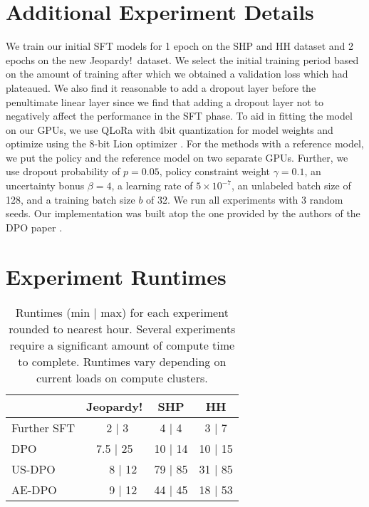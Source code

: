 \documentclass{article} \usepackage{iclr2023_conference,times}
\newcommand{\add}[1]{#1}
\begin{document}
\section{Additional Experiment Details}
\label{a:additional_details}
We train our initial SFT models for 1 epoch on the SHP and HH dataset and 2 epochs on the new Jeopardy!\ dataset.
We select the initial training period based on the amount of training after which we obtained a validation loss which had plateaued.
We also find it reasonable to add a dropout layer before the penultimate linear layer since we find that adding a dropout layer not to negatively affect the performance in the SFT phase.
To aid in fitting the model on our GPUs, we use QLoRa \citep{lora, qlora} with 4bit quantization for model weights and optimize using the 8-bit Lion optimizer \citep{chen2023symbolic}.
For the methods with a reference model, we put the policy and the reference model on two separate GPUs. Further, we use dropout probability of $p=0.05$, policy constraint weight $\gamma=0.1$, an uncertainty bonus $\beta = 4$, a learning rate of $5 \times 10^{-7}$, an unlabeled batch size of 128, and a training batch size $b$ of 32. We run all experiments with 3 random seeds. \add{Our implementation was built atop the one provided by the authors of the DPO paper \citep{dpo}.}


\section{Experiment Runtimes}
\label{a:exptruntimes}
\begin{table}[h!]
\centering
\begin{tabular}{l|c|c|c|}
\cline{2-4}
                                  & Jeopardy! & SHP     & HH      \\ \hline
\multicolumn{1}{|l|}{Further SFT} & \ 2 $\vert$ 3    & 4 $\vert$ 4   & 3 $\vert$ 7   \\ \hline
\multicolumn{1}{|l|}{DPO}         & 7.5 $\vert$ 25  & 10 $\vert$ 14 & 10 $\vert$ 15 \\ \hline
\multicolumn{1}{|l|}{US-DPO}      & \ \ \ 8 $\vert$ 12    & 79 $\vert$ 85 & 31 $\vert$ 85 \\ \hline
\multicolumn{1}{|l|}{AE-DPO}      & \ \ \ 9 $\vert$ 12    & 44 $\vert$ 45 & 18 $\vert$ 53 \\ \hline
\end{tabular}
\caption{Runtimes (min $\vert$ max) for each experiment rounded to nearest hour. Several experiments require a significant amount of compute time to complete. Runtimes vary depending on current loads on compute clusters.}
\label{t:exptruntimes}
\end{table}
\end{document}
